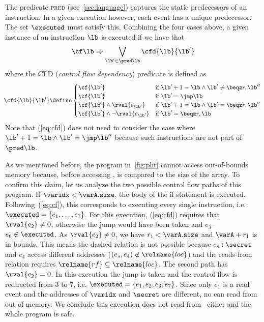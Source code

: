 \documentclass[conference]{IEEEtran}
\begin{document}
The predicate \textsc{pred} (see~\autoref{sec:language}) captures the static predecessors of an instruction.
In a given execution however, each event has a unique predecessor.
The set $\executed$ must satisfy this.
Combining the four cases above, a given instance of an instruction $\lb$ is executed if we have that
\begin{equation}
\label{eq:cf}
{\cf \lb} \Rightarrow {\bigvee\limits_{{\lb'} \in \pred \lb} \cfd{\lb}{\lb'}}
\end{equation}
where the \textsc{CFD} (\emph{control flow dependency}) predicate is defined as
{\small
\begin{equation}
\label{eq:cfd}
\hspace*{-1mm}\cfd{\lb}{\lb'} \define 
     \begin{cases}
       \cf{\lb'} & \text{if } \lb'+1 = \lb \land \lb' \neq \beqz r,\lb'' \\
       \cf{\lb'} & \text{if } \lb' = \jmp \lb \\
       {{\cf{\lb'}} \land \rval{e_{\lb'}}} & \text{if } \lb'+1 = \lb \land \lb' = \beqz r,\lb'' \\
       {{\cf{\lb'}} \land {\neg \rval{e_{\lb'}}}} & \text{if } \lb' = \beqz r,\lb \\
     \end{cases}
\end{equation}}
Note that (\ref{eq:cfd}) does not need to consider the case where $\lb'+1 = \lb \land \lb' = \jmp \lb''$ because such instructions are not part of $\pred \lb$.

As we mentioned before, the program in~\autoref{fig:pht} cannot access out-of-bounds memory because, before accessing \varA, \varidx is compared to the size of the array.
To confirm this claim, let us analyze the two possible control flow paths of this program.
If $\varidx < \varA.\texttt{size}$, the body of the if statement is executed.
Following~(\ref{eq:cf}), this corresponds to executing every single instruction, i.e. $\executed = \{ e_1, \dots, e_7\}$.
For this execution, (\ref{eq:cfd}) requires that $\rval{e_2} \not = 0$, otherwise the jump would have been taken and $e_3$--$e_6 \not \in \executed$.
As $\rval{e_2} \not = 0$, we have $r_1 < \varA.\texttt{size}$ and $\varA + r_1$ is in bounds.
This means the dashed  relation is not possible because $e_s: \secret$ and $e_4$ access different addresses ($(e_s,e_4) \not \in \relname{loc}$) and the reads-from relation requires $\relname{rf} \subseteq \relname{loc}$.
The second path has $\rval{e_2} = 0$.
In this execution the jump is taken and the control flow is redirected from $3$ to $7$, i.e. $\executed = \{ e_1, e_2, e_3, e_7\}$.
Since only $e_1$ is a read event and the addresses of $\varidx$ and $\secret$ are different, no \load can read from out-of-memory.
We conclude this execution does not read from \secret\ either and the whole program is safe.
\end{document}
